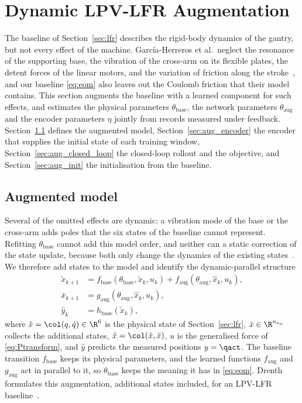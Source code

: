 \section{Dynamic LPV-LFR Augmentation}\label{sec:augmentation}

The baseline of Section~\ref{sec:lfr} describes the rigid-body dynamics of
the gantry, but not every effect of the machine.
Garc\'ia-Herreros et al.\ neglect the resonance of the supporting base, the
vibration of the cross-arm on its flexible plates, the detent forces of the
linear motors, and the variation of friction along the
stroke~\cite[Sec.~2.4]{garcia2013model}, and our baseline \eqref{eq:eom}
also leaves out the Coulomb friction that their model contains.
This section augments the baseline with a learned component for such
effects, and estimates the physical parameters $\theta_{\mathrm{base}}$, the
network parameters $\theta_{\mathrm{aug}}$ and the encoder parameters $\eta$
jointly from records measured under feedback.
Section~\ref{sec:aug_structure} defines the augmented model,
Section~\ref{sec:aug_encoder} the encoder that supplies the initial state of
each training window, Section~\ref{sec:aug_closed_loop} the closed-loop
rollout and the objective, and Section~\ref{sec:aug_init} the initialisation
from the baseline.

\subsection{Augmented model}\label{sec:aug_structure}
Several of the omitted effects are dynamic: a vibration mode of the base or
the cross-arm adds poles that the six states of the baseline cannot
represent.
Refitting $\theta_{\mathrm{base}}$ cannot add this model order, and neither
can a static correction of the state update, because both only change the
dynamics of the existing states~\cite[Sec.~2]{hoekstra2025lfr}.
We therefore add states to the model and identify the dynamic-parallel
structure~\cite[Table~1]{hoekstra2026lfr}
\begin{equation}
\begin{aligned}
 \tilde x_{k+1}
 &=f_{\mathrm{base}}(\theta_{\mathrm{base}},\tilde x_k,u_k)
   +f_{\mathrm{aug}}(\theta_{\mathrm{aug}},\hat x_k,u_k),\\
 \bar x_{k+1}
 &=g_{\mathrm{aug}}(\theta_{\mathrm{aug}},\hat x_k,u_k),\\
 \hat y_k&=h_{\mathrm{base}}(\tilde x_k),
\end{aligned}
\label{eq:aug_transition}
\end{equation}
where $\tilde x=\col(q,\dot q)\in\R^6$ is the physical state of
Section~\ref{sec:lfr}, $\bar x\in\R^{n_{x_a}}$ collects the additional
states, $\hat x=\col(\tilde x,\bar x)$, $u$ is the generalised force of
\eqref{eq:Ptransform}, and $\hat y$ predicts the measured positions
$y=\qact$.
The baseline transition $f_{\mathrm{base}}$ keeps its physical parameters,
and the learned functions $f_{\mathrm{aug}}$ and $g_{\mathrm{aug}}$ act in
parallel to it, so $\theta_{\mathrm{base}}$ keeps the meaning it has in
\eqref{eq:eom}.
Drenth formulates this augmentation, additional states included, for an
LPV-LFR baseline~\cite[Sec.~5.2]{drenth2025thesis}.

